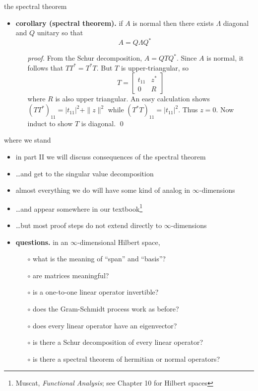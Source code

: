 \documentclass[10pt,hyperref]{beamer}
\newcommand{\blocktwo}[4]{\left[\begin{array}{c|c} #1 & #2 \\ \hline #3 & #4 \end{array}\right]}
\newcommand{\bqed}{{\color{blue}\qed}}
\begin{document}
\begin{frame}{the spectral theorem}

\begin{itemize}
\item \textbf{corollary (spectral theorem).} if $A$ is normal then there exists $\Lambda$ diagonal and $Q$ unitary so that
    $$A=Q \Lambda Q^*$$

    \begin{itemize}
    \item[\emph{proof.}] From the Schur decomposition, $A=QTQ^*$.  Since $A$ is normal, it follows that $TT^*=T^*T$.  But $T$ is upper-triangular, so
    $$T = \blocktwo{t_{11}}{z^*}{0}{R}$$
where $R$ is also upper triangular.  An easy calculation shows $(TT^*)_{11} = |t_{11}|^2 + \|z\|^2$ while $(T^*T)_{11} = |t_{11}|^2$.  Thus $z=0$.  Now induct to show $T$ is diagonal. \bqed
    \end{itemize}
\end{itemize}
\end{frame}


\begin{frame}{where we stand}

\begin{itemize}
\item in part II we will discuss consequences of the spectral theorem
\item \dots and get to the singular value decomposition
\item almost everything we do will have some kind of analog in $\infty$-dimensions
\item \dots and appear somewhere in our textbook\footnote{Muscat, \emph{Functional Analysis}; see Chapter 10 for Hilbert spaces}
\item \dots but most proof steps do not extend directly to $\infty$-dimensions
\item \textbf{questions.} in an $\infty$-dimensional Hilbert space,
    \begin{itemize}
    \item[$\circ$] what is the meaning of ``span'' and ``basis''?
    \item[$\circ$] are matrices meaningful?
    \item[$\circ$] is a one-to-one linear operator invertible?
    \item[$\circ$] does the Gram-Schmidt process work as before?
    \item[$\circ$] does every linear operator have an eigenvector?
    \item[$\circ$] is there a Schur decomposition of every linear operator?
    \item[$\circ$] is there a spectral theorem of hermitian or normal operators?
    \end{itemize}
\end{itemize}
\end{frame}
\end{document}
